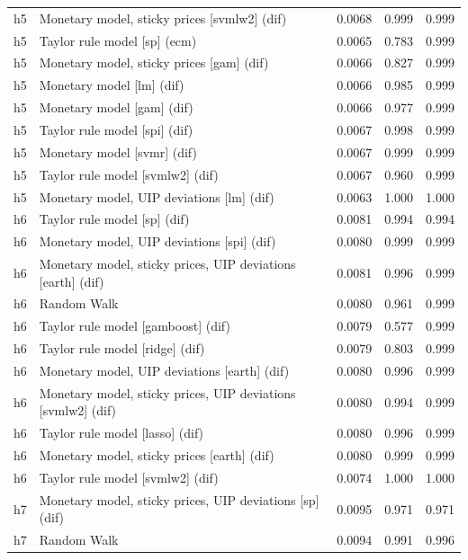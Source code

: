 \begin{ThreePartTable}
\begin{longtable}[t]{cp{5.5cm}ccc}
h5 & \raggedright Monetary model, sticky prices [svmlw2] (dif) & 0.0068 & 0.999 & 0.999\\
h5 & \raggedright Taylor rule model [sp] (ecm) & 0.0065 & 0.783 & 0.999\\
h5 & \raggedright Monetary model, sticky prices [gam] (dif) & 0.0066 & 0.827 & 0.999\\
h5 & \raggedright Monetary model [lm] (dif) & 0.0066 & 0.985 & 0.999\\
h5 & \raggedright Monetary model [gam] (dif) & 0.0066 & 0.977 & 0.999\\
h5 & \raggedright Taylor rule model [spi] (dif) & 0.0067 & 0.998 & 0.999\\
h5 & \raggedright Monetary model [svmr] (dif) & 0.0067 & 0.999 & 0.999\\
h5 & \raggedright Taylor rule model [svmlw2] (dif) & 0.0067 & 0.960 & 0.999\\
h5 & \raggedright Monetary model, UIP deviations [lm] (dif) & 0.0063 & 1.000 & 1.000\\
\addlinespace
h6 & \raggedright Taylor rule model [sp] (dif) & 0.0081 & 0.994 & 0.994\\
h6 & \raggedright Monetary model, UIP deviations [spi] (dif) & 0.0080 & 0.999 & 0.999\\
h6 & \raggedright Monetary model, sticky prices, UIP deviations [earth] (dif) & 0.0081 & 0.996 & 0.999\\
h6 & \raggedright Random Walk & 0.0080 & 0.961 & 0.999\\
h6 & \raggedright Taylor rule model [gamboost] (dif) & 0.0079 & 0.577 & 0.999\\
h6 & \raggedright Taylor rule model [ridge] (dif) & 0.0079 & 0.803 & 0.999\\
h6 & \raggedright Monetary model, UIP deviations [earth] (dif) & 0.0080 & 0.996 & 0.999\\
h6 & \raggedright Monetary model, sticky prices, UIP deviations [svmlw2] (dif) & 0.0080 & 0.994 & 0.999\\
h6 & \raggedright Taylor rule model [lasso] (dif) & 0.0080 & 0.996 & 0.999\\
h6 & \raggedright Monetary model, sticky prices [earth] (dif) & 0.0080 & 0.999 & 0.999\\
h6 & \raggedright Taylor rule model [svmlw2] (dif) & 0.0074 & 1.000 & 1.000\\
\addlinespace
h7 & \raggedright Monetary model, sticky prices, UIP deviations [sp] (dif) & 0.0095 & 0.971 & 0.971\\
h7 & \raggedright Random Walk & 0.0094 & 0.991 & 0.996\\

\end{longtable}
\end{ThreePartTable}
